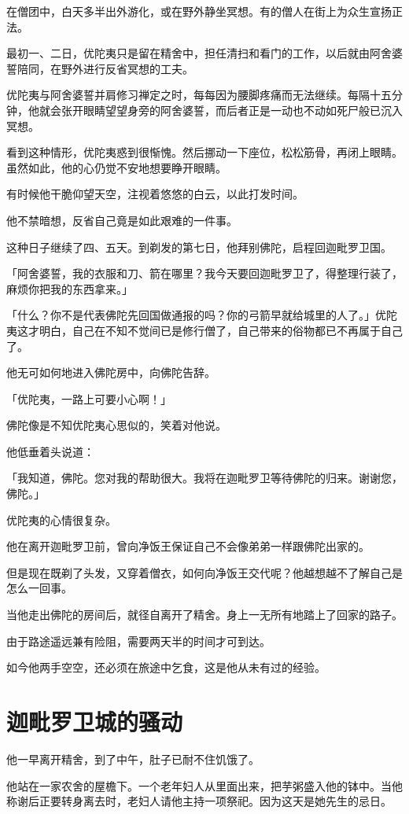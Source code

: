 \documentclass[twoside,openany]{book}
\begin{document}
在僧团中，白天多半出外游化，或在野外静坐冥想。有的僧人在街上为众生宣扬正法。

最初一、二日，优陀夷只是留在精舍中，担任清扫和看门的工作，以后就由阿舍婆誓陪同，在野外进行反省冥想的工夫。

优陀夷与阿舍婆誓并肩修习禅定之时，每每因为腰脚疼痛而无法继续。每隔十五分钟，他就会张开眼睛望望身旁的阿舍婆誓，而后者正是一动也不动如死尸般已沉入冥想。

看到这种情形，优陀夷惑到很惭愧。然后挪动一下座位，松松筋骨，再闭上眼睛。虽然如此，他的心仍觉不安地想要睁开眼睛。

有时候他干脆仰望天空，注视着悠悠的白云，以此打发时间。

他不禁暗想，反省自己竟是如此艰难的一件事。

这种日子继续了四、五天。到剃发的第七日，他拜别佛陀，启程回迦毗罗卫国。

「阿舍婆誓，我的衣服和刀、箭在哪里？我今天要回迦毗罗卫了，得整理行装了，麻烦你把我的东西拿来。」

「什么？你不是代表佛陀先回国做通报的吗？你的弓箭早就给城里的人了。」优陀夷这才明白，自己在不知不觉间已是修行僧了，自己带来的俗物都已不再属于自己了。

他无可如何地进入佛陀房中，向佛陀告辞。

「优陀夷，一路上可要小心啊！」

佛陀像是不知优陀夷心思似的，笑着对他说。

他低垂着头说道：

「我知道，佛陀。您对我的帮助很大。我将在迦毗罗卫等待佛陀的归来。谢谢您，佛陀。」

优陀夷的心情很复杂。

他在离开迦毗罗卫前，曾向净饭王保证自己不会像弟弟一样跟佛陀出家的。

但是现在既剃了头发，又穿着僧衣，如何向净饭王交代呢？他越想越不了解自己是怎么一回事。

当他走出佛陀的房间后，就径自离开了精舍。身上一无所有地踏上了回家的路子。

由于路途遥远兼有险阻，需要两天半的时间才可到达。

如今他两手空空，还必须在旅途中乞食，这是他从未有过的经验。

\section{迦毗罗卫城的骚动}\label{sec7.5}

他一早离开精舍，到了中午，肚子已耐不住饥饿了。

他站在一家农舍的屋檐下。一个老年妇人从里面出来，把芋粥盛入他的钵中。当他称谢后正要转身离去时，老妇人请他主持一项祭祀。因为这天是她先生的忌日。
\end{document}
